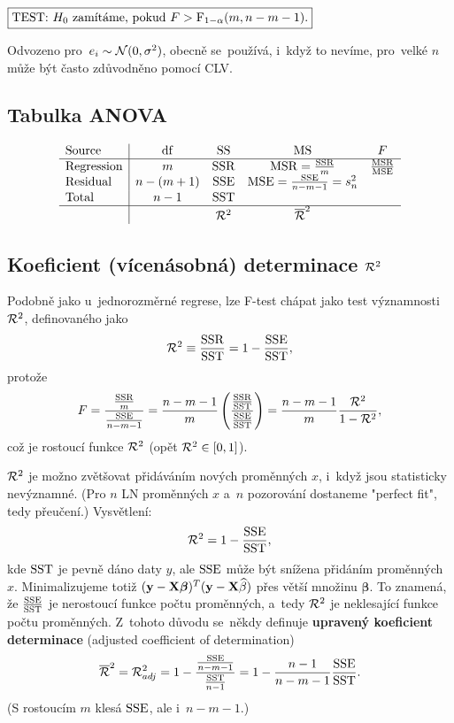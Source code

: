  $\test{F>\FF_{1-\alpha}(m,n-m-1)}$
 
 \begin{remark}
 	Odvozeno pro~$e_i\sim\NN(0,\sigma^2)$, obecně se~používá, i~když to nevíme, pro~velké $n$ může být často zdůvodněno pomocí CLV.
 \end{remark}
\subsection*{Tabulka ANOVA}
$$ \begin{array}{l|cccc}
\text{Source}& \mathrm{df} & \mathrm{SS} & \mathrm{MS} & F \\\hline
\text{Regression} & m & \SSR & \MSR=\frac{\SSR}{m} & \frac{\MSR}{\MSE} \\
\text{Residual} & n-(m+1) & \SSE & \MSE=\frac{\SSE}{n-m-1}=s_n^2 &  \\
\text{Total} & n-1 & \SST &  &  \\\hline
&  & \RR^2 & \overline{\RR}^2 & 
\end{array}
 $$
 \subsection*{Koeficient (vícenásobná) determinace $\RR^2$}
 Podobně jako u~jednorozměrné regrese, lze F-test chápat jako test významnosti $\RR^2$, definovaného jako
 $$ \RR^2\equiv \frac{\SSR}{\SST}=1-\frac{\SSE}{\SST},$$
 protože 
 $$ F=\frac{\frac{\SSR}{m}}{\frac{\SSE}{n-m-1}}=\frac{n-m-1}{m}\left( \frac{\frac{\SSR}{\SST}}{\frac{\SSE}{\SST}} \right)=\frac{n-m-1}{m}\frac{\RR^2}{1-\RR^2},$$
 což je rostoucí funkce $\RR^2$ (opět $\RR^2\in[0,1]$).
 \begin{remark}
 	$\RR^2$ je možno zvětšovat přidáváním nových proměnných $x$, i~když jsou statisticky nevýznamné. (Pro $n$ LN proměnných $x$ a~$n$ pozorování dostaneme "perfect fit", tedy přeučení.) Vysvětlení:
 	$$ \RR^2=1-\frac{\SSE}{\SST},$$
 	kde $\SST$ je pevně dáno daty $y$, ale $\SSE$ může být snížena přidáním proměnných $x$. Minimalizujeme totiž $(\textbf{y}-\textbf{X}\boldsymbol{\beta})^T(\textbf{y}-\textbf{X}\wbeta)$ přes větší množinu $\boldsymbol{\beta}$. To znamená, že $\frac{\SSE}{\SST}$ je nerostoucí funkce počtu proměnných, a~tedy $\RR^2$ je neklesající funkce počtu proměnných. Z~tohoto důvodu se~někdy definuje \textbf{upravený koeficient determinace} (adjusted coefficient of determination)
 	$$ \overline{\RR}^2=\RR_{adj}^2=1-\frac{\frac{\SSE}{n-m-1}}{\frac{\SST}{n-1}}=1-\frac{n-1}{n-m-1}\frac{\SSE}{\SST}.$$
 	(S rostoucím $m$ klesá $\SSE$, ale i~$n-m-1$.)
 \end{remark}
